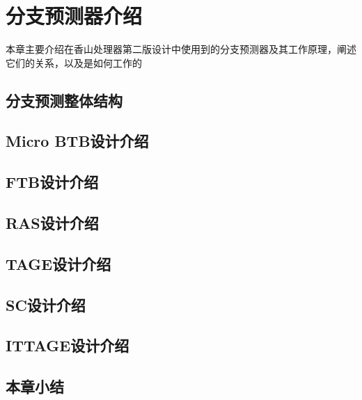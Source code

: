 \chapter{分支预测器介绍}

本章主要介绍在香山处理器第二版设计中使用到的分支预测器及其工作原理，阐述它们的关系，以及是如何工作的

\section{分支预测整体结构}

\section{Micro BTB设计介绍}

\section{FTB设计介绍}

\section{RAS设计介绍}

\section{TAGE设计介绍}

\section{SC设计介绍}

\section{ITTAGE设计介绍}

\section{本章小结}

